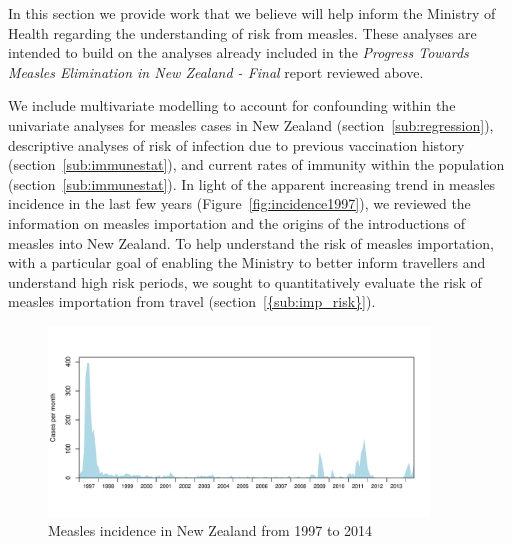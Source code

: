 \documentclass{article}
\begin{document}
In this section we provide work that we believe will help inform the Ministry of Health regarding the understanding of risk from measles. These analyses are intended to build on the analyses already included in the \emph {Progress Towards Measles Elimination in New Zealand - Final} report reviewed above.

We include multivariate modelling to account for confounding within the univariate analyses for measles cases in New Zealand (section~\autoref{sub:regression}), descriptive analyses of risk of infection due to previous vaccination history (section~\autoref{sub:immunestat}), and current rates of immunity within the population (section~\autoref{sub:immunestat}). In light of the apparent increasing trend in measles incidence in the last few years (Figure~\autoref{fig:incidence1997}), we reviewed the information on measles importation and the origins of the introductions of measles into New Zealand. To help understand the risk of measles importation, with a particular goal of enabling the Ministry to better inform travellers and understand high risk periods, we sought to quantitatively evaluate the risk of measles importation from travel (section~\autoref{{sub:imp_risk}}).

\begin{figure}
     \centering
     \includegraphics[width=0.9\textwidth]{incidence_1997_2014.pdf}
     \caption{Measles incidence in New Zealand from 1997 to 2014}
     \label{fig:incidence1997}
\end{figure}

\end{document}
